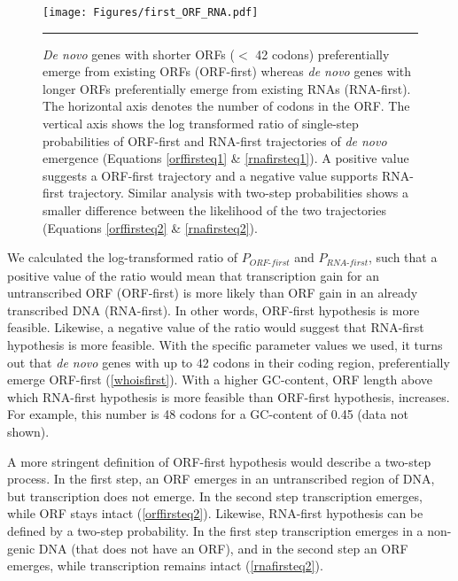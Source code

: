 \documentclass[12pt,a4paper]{article}
\begin{document}
\begin{figure}[!t]
\centering
\texttt{[image: Figures/first\_ORF\_RNA.pdf]}
\caption{\textit{De novo} genes with shorter ORFs ($<$ 42 codons) preferentially emerge from existing ORFs (ORF-first) whereas \textit{de novo} genes with longer ORFs preferentially emerge from existing RNAs (RNA-first). The horizontal axis denotes the number of codons in the ORF. The vertical axis shows the log transformed ratio of single-step probabilities of ORF-first and RNA-first trajectories of \textit{de novo} emergence (Equations \ref{orffirsteq1} \& \ref{rnafirsteq1}). A positive value suggests a ORF-first trajectory and a negative value supports RNA-first trajectory. Similar analysis with two-step probabilities shows a smaller difference between the likelihood of the two trajectories (Equations \ref{orffirsteq2} \& \ref{rnafirsteq2}).}
\label{whoisfirst}
\vspace{1ex}
\hrule
\end{figure}
We calculated the log-transformed ratio of $P_\textit{ORF-first}$ and $P_\textit{RNA-first}$, such that a positive value of the ratio would mean that transcription gain for an untranscribed ORF (ORF-first) is more likely than ORF gain in an already transcribed DNA (RNA-first). In other words, ORF-first hypothesis is more feasible. Likewise, a negative value of the ratio would suggest that RNA-first hypothesis is more feasible. With the specific parameter values we used, it turns out that \textit{de novo} genes with up to 42 codons in their coding region, preferentially emerge ORF-first (\autoref{whoisfirst}). With a higher GC-content, ORF length above which RNA-first hypothesis is more feasible than ORF-first hypothesis, increases. For example, this number is 48 codons for a GC-content of 0.45 (data not shown).

A more stringent definition of ORF-first hypothesis would describe a two-step process. In the first step, an ORF emerges in an untranscribed region of DNA, but transcription does not emerge. In the second step transcription emerges, while ORF stays intact (\autoref{orffirsteq2}). Likewise, RNA-first hypothesis can be defined by a two-step probability. In the first step transcription emerges in a non-genic DNA (that does not have an ORF), and in the second step an ORF emerges, while transcription remains intact (\autoref{rnafirsteq2}).
\end{document}
